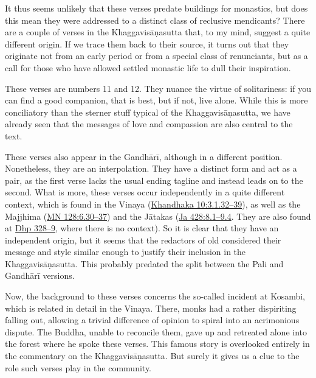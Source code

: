 \documentclass[12pt,openany]{book}%
\begin{document}
It thus seems unlikely that these verses predate buildings for monastics, but does this mean they were addressed to a distinct class of reclusive mendicants? There are a couple of verses in the \textsanskrit{Khaggavisāṇasutta} that, to my mind, suggest a quite different origin. If we trace them back to their source, it turns out that they originate not from an early period or from a special class of renunciants, but as a call for those who have allowed settled monastic life to dull their inspiration.

These verses are numbers 11 and 12. They nuance the virtue of solitariness: if you can find a good companion, that is best, but if not, live alone. While this is more conciliatory than the sterner stuff typical of the \textsanskrit{Khaggavisāṇasutta}, we have already seen that the messages of love and compassion are also central to the text.

These verses also appear in the \textsanskrit{Gandhārī}, although in a different position. Nonetheless, they are an interpolation. They have a distinct form and act as a pair, as the first verse lacks the usual ending tagline and instead leads on to the second. What is more, these verses occur independently in a quite different context, which is found in the Vinaya (\href{https://suttacentral.net/pli-tv-kd10/en/brahmali\#3.1.32}{Khandhaka 10:3.1.32–39}), as well as the Majjhima (\href{https://suttacentral.net/mn128/en/sujato\#6.30}{MN 128:6.30–37}) and the \textsanskrit{Jātakas} (\href{https://suttacentral.net/ja428}{Ja 428:8.1–9.4}. They are also found at \href{https://suttacentral.net/dhp328/en/sujato}{Dhp 328–9}, where there is no context). So it is clear that they have an independent origin, but it seems that the redactors of old considered their message and style similar enough to justify their inclusion in the \textsanskrit{Khaggavisāṇasutta}. This probably predated the split between the Pali and \textsanskrit{Gandhārī} versions.

Now, the background to these verses concerns the so-called incident at Kosambi, which is related in detail in the Vinaya. There, monks had a rather dispiriting falling out, allowing a trivial difference of opinion to spiral into an acrimonious dispute. The Buddha, unable to reconcile them, gave up and retreated alone into the forest where he spoke these verses. This famous story is overlooked entirely in the commentary on the \textsanskrit{Khaggavisāṇasutta}. But surely it gives us a clue to the role such verses play in the community.
\end{document}
